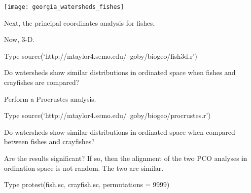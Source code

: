 \documentclass[t]{beamer}
\begin{document}
{
\begin{frame}[plain]
\end{frame}
}

\begin{frame}[plain]
	\centering
	\texttt{[image: georgia\_watersheds\_fishes]}
\end{frame}


\begin{frame}[plain]{Next, the principal coordinates analysis for fishes.}

	\hangpara Now, 3-D.

\begin{block}{Type}
	source(`http://mtaylor4.semo.edu/~goby/biogeo/fish3d.r')
\end{block}
\end{frame}


{
\begin{frame}[plain]
\end{frame}
}

\begin{frame}[plain]{Do watersheds show similar distributions in ordinated space when fishes and crayfishes are compared?}

	\hangpara Perform a Procrustes analysis.

\begin{block}{Type}
	source(`http://mtaylor4.semo.edu/~goby/biogeo/procrustes.r')
\end{block}
\end{frame}


{
\begin{frame}[plain]
\end{frame}
}

\begin{frame}[plain]{Do watersheds show similar distributions in ordinated space when compared between fishes and crayfishes?}

	\hangpara Are the results significant?  If so, then the alignment of the two PCO analyses in ordination space is not random. The two are similar.

\begin{block}{Type}
	protest(fish.sc, crayfish.sc, permutations = 9999)
\end{block}
\end{frame}
\end{document}
